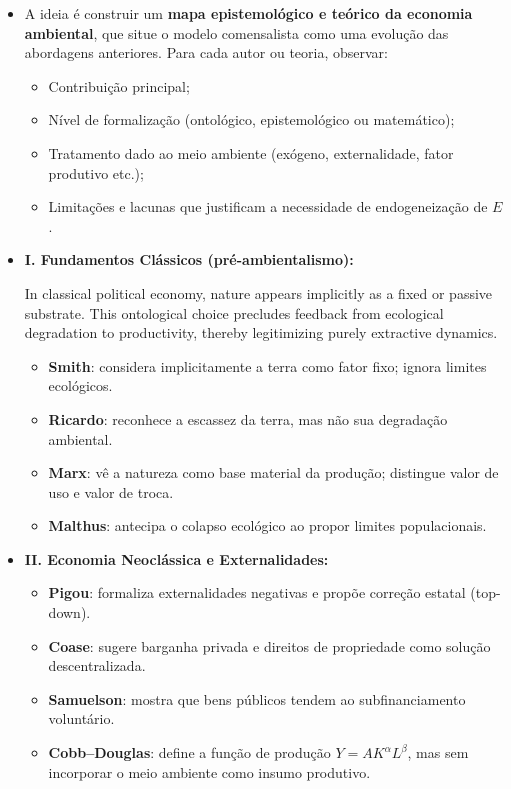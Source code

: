 \documentclass[a4paper,12pt,oneside,brazil,english]{abntex2}
\begin{document}
    \begin{itemize}
        \item A ideia é construir um \textbf{mapa epistemológico e teórico da economia ambiental}, que situe o modelo comensalista como uma evolução das abordagens anteriores. Para cada autor ou teoria, observar:
        \begin{itemize}
            \item Contribuição principal;
            \item Nível de formalização (ontológico, epistemológico ou matemático);
            \item Tratamento dado ao meio ambiente (exógeno, externalidade, fator produtivo etc.);
            \item Limitações e lacunas que justificam a necessidade de endogeneização de $E$.
        \end{itemize}

        \item \textbf{I. Fundamentos Clássicos (pré-ambientalismo):}
        
In classical political economy, nature appears implicitly as a fixed or passive substrate. This ontological choice precludes feedback from ecological degradation to productivity, thereby legitimizing purely extractive dynamics.

        \begin{itemize}
            \item \textbf{Smith}: considera implicitamente a terra como fator fixo; ignora limites ecológicos.
            \item \textbf{Ricardo}: reconhece a escassez da terra, mas não sua degradação ambiental.
            \item \textbf{Marx}: vê a natureza como base material da produção; distingue valor de uso e valor de troca.
            \item \textbf{Malthus}: antecipa o colapso ecológico ao propor limites populacionais.
        \end{itemize}

        \item \textbf{II. Economia Neoclássica e Externalidades:}
        \begin{itemize}
            \item \textbf{Pigou}: formaliza externalidades negativas e propõe correção estatal (top-down).
            \item \textbf{Coase}: sugere barganha privada e direitos de propriedade como solução descentralizada.
            \item \textbf{Samuelson}: mostra que bens públicos tendem ao subfinanciamento voluntário.
            \item \textbf{Cobb–Douglas}: define a função de produção $Y = A K^\alpha L^\beta$, mas sem incorporar o meio ambiente como insumo produtivo.
        \end{itemize}


\end{itemize}
\end{document}
